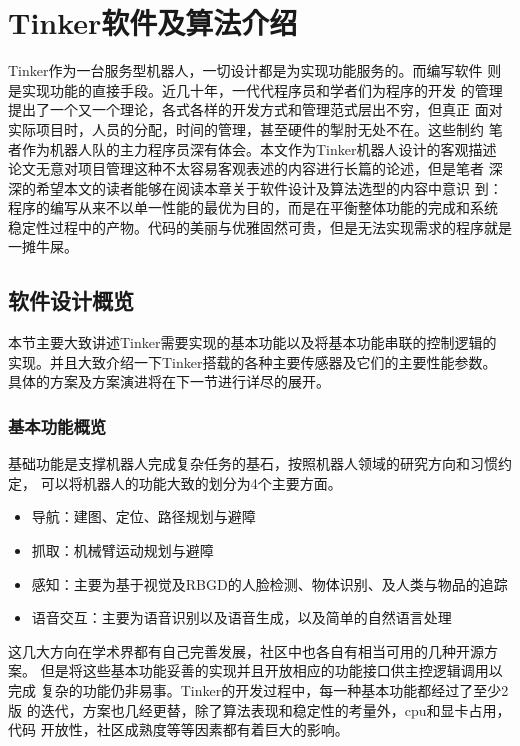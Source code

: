 \chapter{Tinker软件及算法介绍}
\label{cha:chapter03}

Tinker作为一台服务型机器人，一切设计都是为实现功能服务的。而编写软件
则是实现功能的直接手段。近几十年，一代代程序员和学者们为程序的开发
的管理提出了一个又一个理论，各式各样的开发方式和管理范式层出不穷，但真正
面对实际项目时，人员的分配，时间的管理，甚至硬件的掣肘无处不在。这些制约
笔者作为机器人队的主力程序员深有体会。本文作为Tinker机器人设计的客观描述
论文无意对项目管理这种不太容易客观表述的内容进行长篇的论述，但是笔者
深深的希望本文的读者能够在阅读本章关于软件设计及算法选型的内容中意识
到：程序的编写从来不以单一性能的最优为目的，而是在平衡整体功能的完成和系统
稳定性过程中的产物。代码的美丽与优雅固然可贵，但是无法实现需求的程序就是
一摊牛屎。

\section{软件设计概览}

本节主要大致讲述Tinker需要实现的基本功能以及将基本功能串联的控制逻辑的
实现。并且大致介绍一下Tinker搭载的各种主要传感器及它们的主要性能参数。
具体的方案及方案演进将在下一节进行详尽的展开。

\subsection{基本功能概览}

基础功能是支撑机器人完成复杂任务的基石，按照机器人领域的研究方向和习惯约定，
可以将机器人的功能大致的划分为4个主要方面。

\begin{itemize}
  \item 导航：建图、定位、路径规划与避障
  \item 抓取：机械臂运动规划与避障
  \item 感知：主要为基于视觉及RBGD的人脸检测、物体识别、及人类与物品的追踪
  \item 语音交互：主要为语音识别以及语音生成，以及简单的自然语言处理
\end{itemize}

这几大方向在学术界都有自己完善发展，社区中也各自有相当可用的几种开源方案。
但是将这些基本功能妥善的实现并且开放相应的功能接口供主控逻辑调用以完成
复杂的功能仍非易事。Tinker的开发过程中，每一种基本功能都经过了至少2版
的迭代，方案也几经更替，除了算法表现和稳定性的考量外，cpu和显卡占用，代码
开放性，社区成熟度等等因素都有着巨大的影响。

